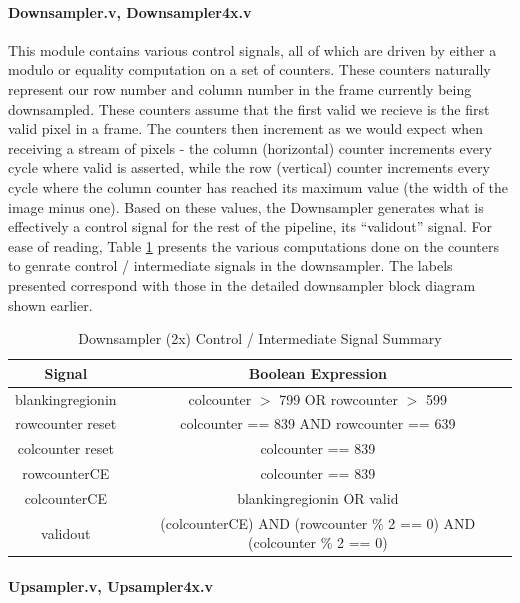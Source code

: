 \paragraph{Downsampler.v, Downsampler4x.v}
This module contains various control signals, all of which are driven by either
a modulo or equality computation on a set of counters. These counters naturally
represent our row number and column number in the frame currently being downsampled.
These counters assume that the first valid we recieve is the first valid pixel in a 
frame. The counters then increment as we would expect when receiving a stream of pixels - 
the column (horizontal) counter increments every cycle where valid is asserted, 
while the row (vertical) counter increments every cycle where the column counter
has reached its maximum value (the width of the image minus one). Based on these
values, the Downsampler generates what is effectively a control signal for the
rest of the pipeline, its ``validout'' signal. For ease of reading, Table \ref{wrap-tab:downsample}
presents the various computations done on the counters to genrate control / 
intermediate signals in the downsampler. The labels presented correspond with
those in the detailed downsampler block diagram shown earlier.

\begin{table}
    \tiny
\noindent \begin{tabular}{ c | c } \toprule
Signal & Boolean Expression \\\toprule
blankingregionin & colcounter $>$ 799 OR rowcounter $>$ 599 \\
rowcounter reset & colcounter == 839 AND rowcounter == 639 \\
colcounter reset & colcounter == 839 \\
rowcounterCE & colcounter == 839 \\
colcounterCE & blankingregionin OR valid \\
validout & (colcounterCE) AND (rowcounter \% 2 == 0) AND (colcounter \% 2 == 0) \\
\end{tabular}
\caption{ Downsampler (2x) Control / Intermediate Signal Summary } \label{wrap-tab:downsample}
\end{table}

\paragraph{Upsampler.v, Upsampler4x.v}

